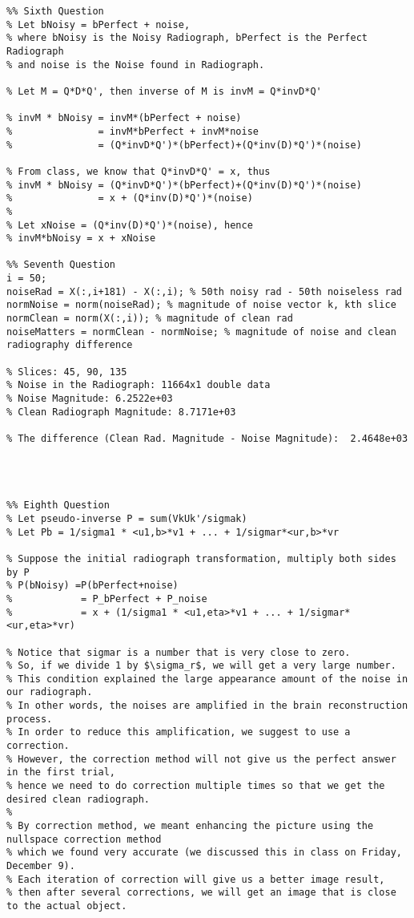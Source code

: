 \documentclass{article}
\begin{document}
\begin{verbatim}
%% Sixth Question
% Let bNoisy = bPerfect + noise, 
% where bNoisy is the Noisy Radiograph, bPerfect is the Perfect Radiograph 
% and noise is the Noise found in Radiograph.

% Let M = Q*D*Q', then inverse of M is invM = Q*invD*Q'

% invM * bNoisy = invM*(bPerfect + noise)
%               = invM*bPerfect + invM*noise
%               = (Q*invD*Q')*(bPerfect)+(Q*inv(D)*Q')*(noise)

% From class, we know that Q*invD*Q' = x, thus
% invM * bNoisy = (Q*invD*Q')*(bPerfect)+(Q*inv(D)*Q')*(noise)
%               = x + (Q*inv(D)*Q')*(noise)
%
% Let xNoise = (Q*inv(D)*Q')*(noise), hence
% invM*bNoisy = x + xNoise

%% Seventh Question
i = 50;
noiseRad = X(:,i+181) - X(:,i); % 50th noisy rad - 50th noiseless rad
normNoise = norm(noiseRad); % magnitude of noise vector k, kth slice
normClean = norm(X(:,i)); % magnitude of clean rad
noiseMatters = normClean - normNoise; % magnitude of noise and clean radiography difference

% Slices: 45, 90, 135
% Noise in the Radiograph: 11664x1 double data
% Noise Magnitude: 6.2522e+03
% Clean Radiograph Magnitude: 8.7171e+03

% The difference (Clean Rad. Magnitude - Noise Magnitude):  2.4648e+03




%% Eighth Question
% Let pseudo-inverse P = sum(VkUk'/sigmak)
% Let Pb = 1/sigma1 * <u1,b>*v1 + ... + 1/sigmar*<ur,b>*vr

% Suppose the initial radiograph transformation, multiply both sides by P
% P(bNoisy) =P(bPerfect+noise)
%            = P_bPerfect + P_noise
%            = x + (1/sigma1 * <u1,eta>*v1 + ... + 1/sigmar*<ur,eta>*vr)

% Notice that sigmar is a number that is very close to zero. 
% So, if we divide 1 by $\sigma_r$, we will get a very large number. 
% This condition explained the large appearance amount of the noise in our radiograph. 
% In other words, the noises are amplified in the brain reconstruction process. 
% In order to reduce this amplification, we suggest to use a correction. 
% However, the correction method will not give us the perfect answer in the first trial, 
% hence we need to do correction multiple times so that we get the desired clean radiograph. 
% 
% By correction method, we meant enhancing the picture using the nullspace correction method 
% which we found very accurate (we discussed this in class on Friday, December 9). 
% Each iteration of correction will give us a better image result, 
% then after several corrections, we will get an image that is close to the actual object.

\end{verbatim}
\end{document}

